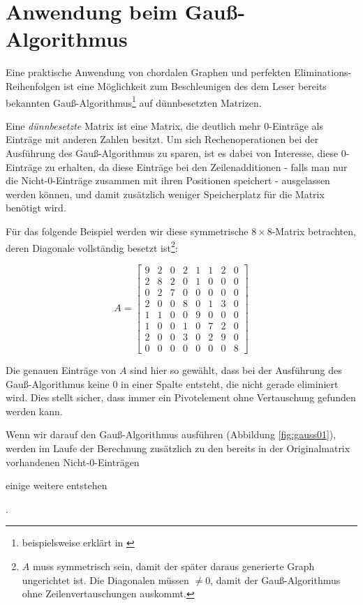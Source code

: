 \section{Anwendung beim Gauß-Algorithmus}
Eine praktische Anwendung von chordalen Graphen und perfekten Eliminations-Rei\-hen\-fol\-gen ist eine Möglichkeit zum Beschleunigen des dem Leser bereits bekannten Gauß-Algorithmus\footnote{beispielsweise erklärt in \cite[Abschnitt 3.3]{stykel}} auf dünnbesetzten Matrizen.

Eine \textit{dünnbesetzte} Matrix ist eine Matrix, die deutlich mehr \( 0 \)-Einträge als Einträge mit anderen Zahlen besitzt. Um sich Rechenoperationen bei der Ausführung des Gauß-Algorithmus zu sparen, ist es dabei von Interesse, diese \( 0 \)-Einträge zu erhalten, da diese Einträge bei den Zeilenadditionen  - falls man nur die Nicht-\( 0 \)-Einträge zusammen mit ihren Positionen speichert - ausgelassen werden können, und damit zusätzlich weniger Speicherplatz für die Matrix benötigt wird.

Für das folgende Beispiel werden wir diese symmetrische \( 8 \times 8 \)-Matrix betrachten, deren Diagonale vollständig besetzt ist\footnote{\( A \) muss symmetrisch sein, damit der später daraus generierte Graph ungerichtet ist. Die Diagonalen müssen \( \neq 0 \), damit der Gauß-Algorithmus ohne Zeilenvertauschungen auskommt.}:

\[
	A =
	\begin{bmatrix}
		9 & 2 & 0 & 2 & 1 & 1 & 2 & 0 \\
		2 & 8 & 2 & 0 & 1 & 0 & 0 & 0 \\
		0 & 2 & 7 & 0 & 0 & 0 & 0 & 0 \\
		2 & 0 & 0 & 8 & 0 & 1 & 3 & 0 \\
		1 & 1 & 0 & 0 & 9 & 0 & 0 & 0 \\
		1 & 0 & 0 & 1 & 0 & 7 & 2 & 0 \\
		2 & 0 & 0 & 3 & 0 & 2 & 9 & 0 \\
		0 & 0 & 0 & 0 & 0 & 0 & 0 & 8
	\end{bmatrix}
\]

Die genauen Einträge von \( A \) sind hier so gewählt, dass bei der Ausführung des Gauß-Algorithmus keine \( 0 \) in einer Spalte entsteht, die nicht gerade eliminiert wird. Dies stellt sicher, dass immer ein Pivotelement ohne Vertauschung gefunden werden kann.

Wenn wir darauf den Gauß-Algorithmus ausführen (Abbildung \ref{fig:gauss01}), werden im Laufe der Berechnung zusätzlich zu den bereits in der Originalmatrix vorhandenen Nicht-\( 0 \)-Einträgen  einige weitere entstehen .

